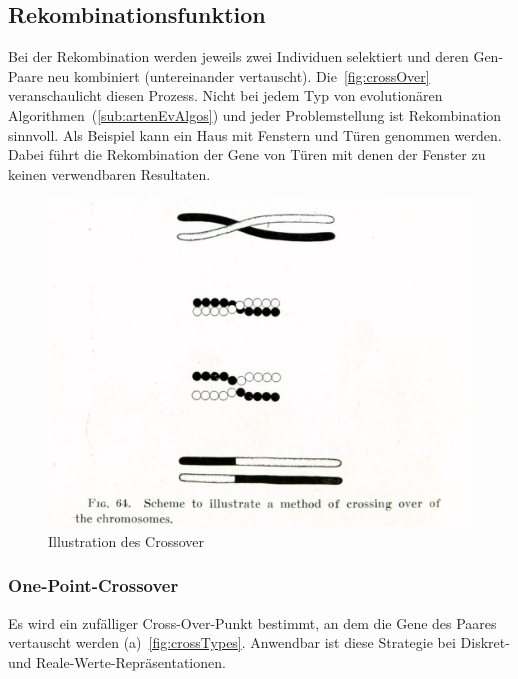     \subsection{Rekombinationsfunktion}

      Bei der Rekombination werden jeweils zwei Individuen selektiert und
      deren Gen-Paare neu kombiniert (untereinander vertauscht).
      Die~\vref{fig:crossOver} veranschaulicht diesen Prozess.
      Nicht bei jedem Typ von evolutionären Algorithmen~(\vref{sub:artenEvAlgos}) und
      jeder Problemstellung ist Rekombination sinnvoll.
      Als Beispiel kann ein Haus mit Fenstern und Türen genommen werden.
      Dabei führt die Rekombination der Gene von Türen mit denen der Fenster zu keinen verwendbaren Resultaten.

      \begin{figure}[H]
        \includegraphics[scale=0.3,center]{graphics/morgan_crossover}
        \caption[\protect{}]{Illustration des Crossover\label{fig:crossOver}}
      \end{figure}

      \subsubsection{One-Point-Crossover}

        Es wird ein zufälliger Cross-Over-Punkt bestimmt, an dem die Gene des Paares vertauscht werden (a)~\vref{fig:crossTypes}.
        Anwendbar ist diese Strategie bei Diskret- und Reale-Werte-Repräsentationen.

